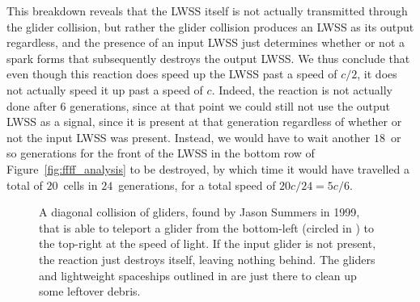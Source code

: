 This breakdown reveals that the LWSS itself is not actually transmitted through the glider collision, but rather the glider collision produces an LWSS as its output regardless, and the presence of an input LWSS just determines whether or not a spark forms that subsequently destroys the output LWSS. We thus conclude that even though this reaction does speed up the LWSS past a speed of $c/2$, it does not actually speed it up past a speed of $c$. Indeed, the reaction is not actually done after $6$ generations, since at that point we could still not use the output LWSS as a signal, since it is present at that generation regardless of whether or not the input LWSS was present. Instead, we would have to wait another $18$~or so generations for the front of the LWSS in the bottom row of Figure~\ref{fig:ffff_analysis} to be destroyed, by which time it would have travelled a total of $20$~cells in $24$~generations, for a total speed of $20c/24 = 5c/6$.

\begin{figure}[!htb]
	\centering{}
	\caption{A diagonal collision of gliders, found by Jason Summers in 1999, that is able to teleport a glider from the bottom-left (circled in ) to the top-right at the speed of light. If the input glider is not present, the reaction just destroys itself, leaving nothing behind. The gliders and lightweight spaceships outlined in  are just there to clean up some leftover debris.}\label{fig:diagonal_lightspeed}
\end{figure}

